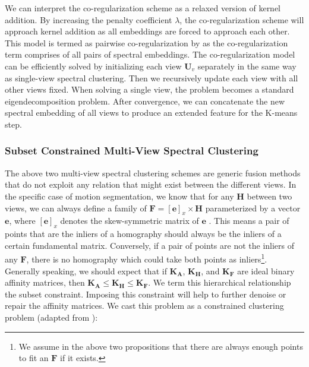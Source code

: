 \documentclass[10pt,twocolumn,letterpaper]{article}
\newcommand{\vect}[1]{\mathbf{#1}}
\newcommand{\matr}[1]{\mathbf{#1}}
\begin{document}
We can interpret the co-regularization scheme as a relaxed version of kernel addition. By increasing the penalty coefficient $\lambda$, the co-regularization scheme will approach kernel addition as all embeddings are forced to approach each other. This model is termed as pairwise co-regularization by \cite{Kumar2011} as the co-regularization term comprises of all pairs of spectral embeddings. The co-regularization model can be efficiently solved by initializing each view $\matr{U}_v$ separately in the same way as single-view spectral clustering. Then we recursively update each view with all other views fixed. When solving a single view, the problem becomes a standard eigendecomposition problem. 
After convergence, we can concatenate the new spectral embedding of all views to produce an extended feature for the K-means step.


\vspace{-0.2cm}
\subsubsection{Subset Constrained Multi-View Spectral Clustering}


The above two multi-view spectral clustering schemes are generic fusion methods that do not exploit any relation that might exist between the different views. In the specific case of motion segmentation, we know that for any $\matr{H}$ between two views, we can always define a family of $\matr{F}=[\vect{e}]_x\times \matr{H}$ parameterized by a vector $\vect{e}$, where $[\vect{e}]_x$ denotes the skew-symmetric matrix of $\vect{e}$ \cite{hartley2003multiple}. This means a pair of points that are the inliers of a homography should always be the inliers of a certain fundamental matrix. Conversely, if a pair of points are not the inliers of any $\matr{F}$, there is no homography which could take both points as inliers\footnote{We assume in the above two propositions that there are always enough points to fit an $\matr{F}$ if it exists.}. Generally speaking, we should expect that if $\mathbf{K_A}$, $\mathbf{K_H}$, and $\mathbf{K_F}$ are ideal binary affinity matrices, then $\mathbf{K_A} \le \mathbf{K_H} \le \mathbf{K_F}$. We term this hierarchical relationship the subset constraint. Imposing this constraint will help to further denoise or repair the affinity matrices. We cast this problem as a constrained clustering problem (adapted from \cite{Wang2014}):
\end{document}
